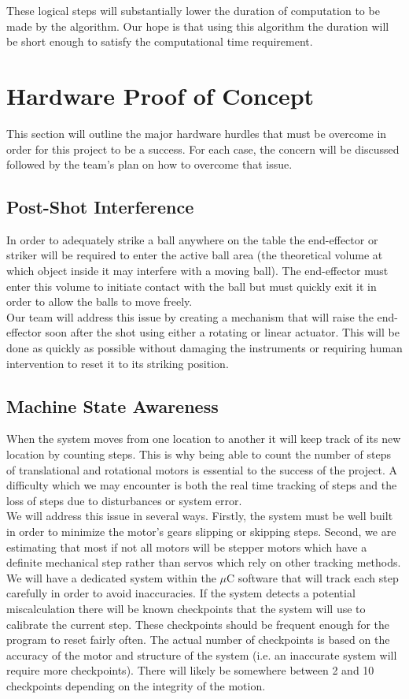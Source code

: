 \documentclass[titlepage]{article}
\begin{document}
These logical steps will substantially lower the duration of computation to be made by the algorithm. Our hope is that using this algorithm the duration will be short enough to satisfy the computational time requirement.



\section{Hardware Proof of Concept}
This section will outline the major hardware hurdles that must be overcome in order for this project to be a success. For each case, the concern will be discussed followed by the team's plan on how to overcome that issue.
\subsection{Post-Shot Interference}
In order to adequately strike a ball anywhere on the table the end-effector or striker will be required to enter the active ball area (the theoretical volume at which object inside it may interfere with a moving ball). The end-effector must enter this volume to initiate contact with the ball but must quickly exit it in order to allow the balls to move freely.\\

Our team will address this issue by creating a mechanism that will raise the end-effector soon after the shot using either a rotating or linear actuator. This will be done as quickly as possible without damaging the instruments or requiring human intervention to reset it to its striking position.
\subsection{Machine State Awareness}
When the system moves from one location to another it will keep track of its new location by counting steps. This is why being able to count the number of steps of translational and rotational motors is essential to the success of the project. A difficulty which we may encounter is both the real time tracking of steps and the loss of steps due to disturbances or system error.\\

We will address this issue in several ways. Firstly, the system must be well built in order to minimize the motor's gears slipping or skipping steps. Second, we are estimating that most if not all motors will be stepper motors which have a definite mechanical step rather than servos which rely on other tracking methods. We will have a dedicated system within the $\mu$C software that will track each step carefully in order to avoid inaccuracies. If the system detects a potential miscalculation there will be known checkpoints that the system will use to calibrate the current step. These checkpoints should be frequent enough for the program to reset fairly often. The actual number of checkpoints is based on the accuracy of the motor and structure of the system (i.e. an inaccurate system will require more checkpoints). There will likely be somewhere between 2 and 10 checkpoints depending on the integrity of the motion.
\end{document}

